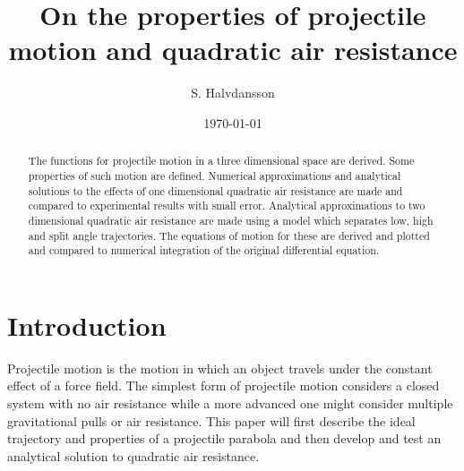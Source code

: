 \documentclass[%
aip,
jmp,
amsmath,amssymb,
reprint,%
]{revtex4-1}
\begin{document}
	
	\title[On the properties of projectile motion and quadratic air resistance]{On the properties of projectile motion and quadratic air resistance}
	
	\author{S. Halvdansson}
	
	\date{\today}
	
	\begin{abstract}
		The functions for projectile motion in a three dimensional space are derived. Some properties of such motion are defined. Numerical approximations and analytical solutions to the effects of one dimensional quadratic air resistance are made and compared to experimental results with small error. Analytical approximations to two dimensional quadratic air resistance are made using a model which separates low, high and split angle trajectories. The equations of motion for these are derived and plotted and compared to numerical integration of the original differential equation.
	\end{abstract}
	
	\maketitle
	
	\section{Introduction}
	Projectile motion is the motion in which an object travels under the constant effect of a force field. The simplest form of projectile motion considers a closed system with no air resistance while a more advanced one might consider multiple gravitational pulls or air resistance. This paper will first describe the ideal trajectory and properties of a projectile parabola and then develop and test an analytical solution to quadratic air resistance.
\end{document}
